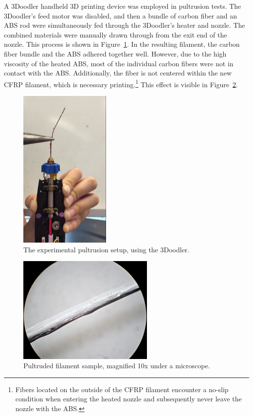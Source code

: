 \indent

A 3Doodler handheld 3D printing device was employed in pultrusion tests. The 3Doodler's feed motor was disabled, and then a bundle of carbon fiber and an ABS rod were simultaneously fed through the 3Doodler's heater and nozzle. The combined materials were manually drawn through from the exit end of the nozzle. This process is shown in Figure~\ref{fig:pultrusion-vid}. In the resulting filament, the carbon fiber bundle and the ABS adhered together well. However, due to the high viscosity of the heated ABS, most of the individual carbon fibers were not in contact with the ABS. Additionally, the fiber is not centered within the new CFRP filament, which is necessary printing.\footnote{Fibers located on the outside of the CFRP filament encounter a no-slip condition when entering the heated nozzle and subsequently never leave the nozzle with the ABS.} This effect is visible in Figure~\ref{fig:pultruded-scope}.\\

\begin{figure}[h!]
    \centering
    \includegraphics[width=0.4\textwidth]{./figures/pultrusion-vid}
    \caption{The experimental pultrusion setup, using the 3Doodler.}
    \label{fig:pultrusion-vid}
\end{figure}

\begin{figure}[h!]
    \centering
    \includegraphics[width=0.6\textwidth]{./figures/pultruded-scope}
    \caption{Pultruded filament sample, magnified 10x under a microscope.}
    \label{fig:pultruded-scope}
\end{figure}

